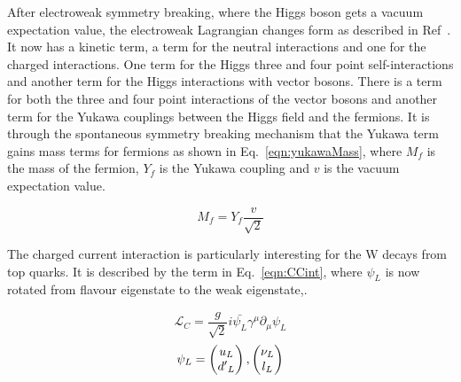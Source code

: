 


After electroweak symmetry breaking, where the Higgs boson gets a vacuum expectation value, the electroweak Lagrangian changes form as described in Ref~\cite{Pich:2005mk}. It now has a kinetic term, a term for the neutral interactions and one for the charged interactions. One term for the Higgs three and four point self-interactions and another term for the Higgs interactions with vector bosons. There is a term for both the three and four point interactions of the vector bosons and another term for the Yukawa couplings between the Higgs field and the fermions. It is through the spontaneous symmetry breaking mechanism that the Yukawa term gains mass terms for fermions as shown in Eq.~\ref{eqn:yukawaMass}, where $M_f$ is the mass of the fermion, $Y_f$ is the Yukawa coupling and $v$ is the vacuum expectation value.

\begin{equation}
M_f = Y_f \frac{v}{\sqrt{2}}
\label{eqn:yukawaMass}
\end{equation}

The charged current interaction is particularly interesting for the W decays from top quarks. It is described by the term in Eq.~\ref{eqn:CCint}, where $\psi_L$ is now rotated from flavour eigenstate to the weak eigenstate,.

\begin{equation}
\label{eqn:CCint}
\mathcal{L}_{C} = \frac{g}{\sqrt{2}} i\bar{\psi_{L}} \gamma^{\mu} \partial_{\mu} \psi_{L}
\end{equation}
\begin{equation*}
\psi_L = \begin{pmatrix} u_L \\ {d'}_L \end{pmatrix}, \begin{pmatrix} \nu_L \\ l_L \end{pmatrix}
\end{equation*}

